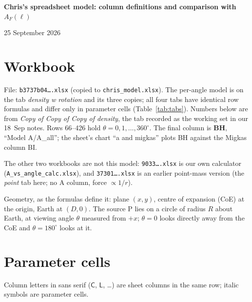 \documentclass[10pt]{article}
\newcommand{\cl}[1]{\mathsf{#1}}
\begin{document}
{\centering\large\textbf{Chris's spreadsheet model: column definitions and comparison with $A_F(\ell)$}\par\normalsize 25 September 2026\par}

\section{Workbook}
File: \texttt{b3737b04\ldots.xlsx} (copied to \texttt{chris\_model.xlsx}). The per-angle model is on the tab
\emph{density w rotation} and its three copies; all four tabs have identical row formulas and differ only in
parameter cells (Table~\ref{tab:tabs}). Numbers below are from \emph{Copy of Copy of Copy of density}, the tab
recorded as the working set in our 18~Sep notes. Rows 66--426 hold $\theta=0,1,\dots,360^\circ$. The final
column is \textbf{BH}, ``Model A/A\_all''; the sheet's chart ``a and migkas'' plots BH against the Migkas column BI.

The other two workbooks are not this model: \texttt{9033\ldots.xlsx} is our own calculator
(\texttt{A\_vs\_angle\_calc.xlsx}), and \texttt{37301\ldots.xlsx} is an earlier point-mass version
(the \emph{point} tab here; no A column, force $\propto 1/r$).

Geometry, as the formulas define it: plane $(x,y)$, centre of expansion (CoE) at the origin, Earth at $(D,0)$.
The source P lies on a circle of radius $R$ about Earth, at viewing angle $\theta$ measured from $+x$;
$\theta=0$ looks directly away from the CoE and $\theta=180^\circ$ looks at it.

\section{Parameter cells}
Column letters in sans serif ($\cl{C}$, $\cl{L}$, \dots) are sheet columns in the same row; italic symbols are parameter cells.
\end{document}
